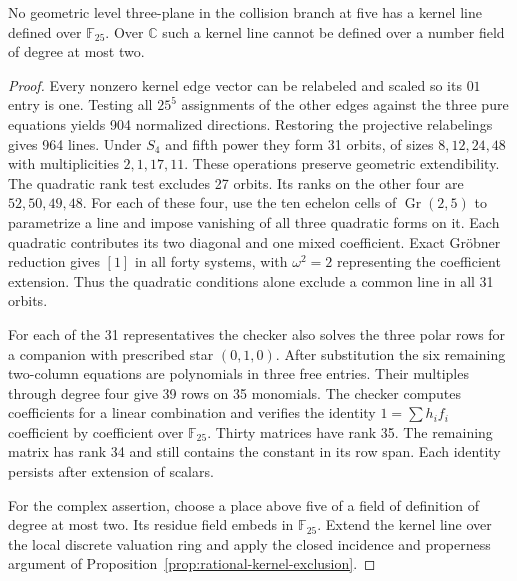 \begin{proposition}
\label{prop:quadratic-kernel-exclusion}
No geometric level three-plane in the collision branch at five
has a kernel line defined over \(\mathbb F_{25}\). Over \(\mathbb C\)
such a kernel line cannot be defined over a number field of degree
at most two.
\end{proposition}
\begin{proof}
Every nonzero kernel edge vector can be relabeled and scaled so its
\(01\) entry is one. Testing all \(25^5\) assignments of the other
edges against the three pure equations yields 904 normalized directions.
Restoring the projective relabelings gives 964 lines. Under \(S_4\)
and fifth power they form 31 orbits, of sizes \(8,12,24,48\) with
multiplicities \(2,1,17,11\). These operations preserve geometric
extendibility. The quadratic rank test excludes 27 orbits. Its ranks
on the other four are \(52,50,49,48\). For each of these four, use the
ten echelon cells of \(\operatorname{Gr}(2,5)\) to parametrize a line
and impose vanishing of all three quadratic forms on it. Each quadratic
contributes its two diagonal and one mixed coefficient. Exact
Gr\"obner reduction gives \([1]\) in all forty systems, with
\(\omega^2=2\) representing the coefficient extension. Thus the
quadratic conditions alone exclude a common line in all 31 orbits.

For each of the 31 representatives the checker also solves the three
polar rows for a companion with prescribed star \((0,1,0)\). After
substitution the six remaining two-column equations are polynomials
in three free entries. Their multiples through degree four give 39
rows on 35 monomials. The checker computes coefficients for a linear
combination and verifies the identity \(1=\sum h_i f_i\) coefficient by
coefficient over \(\mathbb F_{25}\). Thirty matrices have rank 35.
The remaining matrix has rank 34 and still contains the constant in
its row span. Each identity persists after extension of scalars.

For the complex assertion, choose a place above five of a field of
definition of degree at most two. Its residue field embeds in
\(\mathbb F_{25}\). Extend the kernel line over the local discrete
valuation ring and apply the closed incidence and properness argument
of Proposition~\ref{prop:rational-kernel-exclusion}.
\end{proof}

